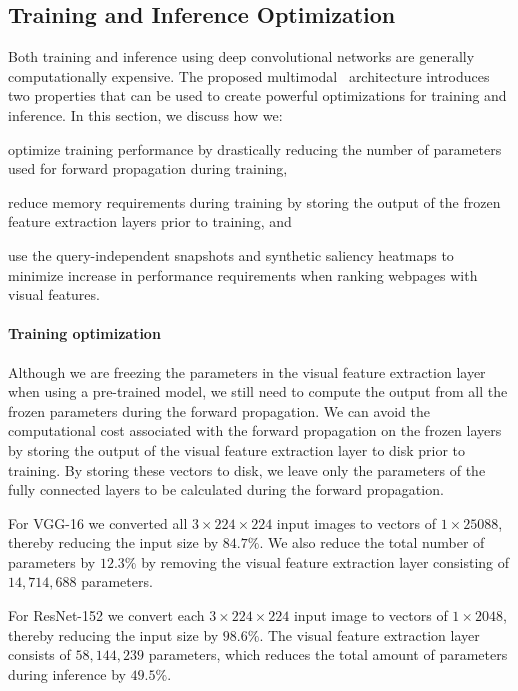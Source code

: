 \subsection{Training and Inference Optimization} \label{sec:sectionoptimalization}
Both training and inference using deep convolutional networks are generally computationally expensive.
The proposed multimodal \modelname~architecture introduces two properties that can be used to create powerful optimizations for training and inference. In this section, we discuss how we: \begin{inparaenum}[(i)]
\item optimize training performance by drastically reducing the number of parameters used for forward propagation during training, 
\item reduce memory requirements during training by storing the output of the frozen feature extraction layers prior to training, and
\item use the query-independent snapshots and synthetic saliency heatmaps to minimize increase in performance requirements when ranking webpages with visual features.
\end{inparaenum}

\paragraph{Training optimization} 
Although we are freezing the parameters in the visual feature extraction layer when using a pre-trained model, we still need to compute the output from all the frozen parameters during the forward propagation. We can avoid the computational cost associated with the forward propagation on the frozen layers by storing the output of the visual feature extraction layer to disk prior to training. By storing these vectors to disk, we leave only the parameters of the fully connected layers to be calculated during the forward propagation. 

For VGG-16 we converted all $3\times224\times224$ input images to vectors of $1\times25088$, thereby reducing the input size by $84.7\%$. We also reduce the total number of parameters by $12.3\%$ by removing the visual feature extraction layer consisting of $14,714,688$ parameters.

For ResNet-152 we convert each $3\times224\times224$ input image to vectors of $1\times2048$, thereby reducing the input size by $98.6\%$. The visual feature extraction layer consists of $58,144,239$ parameters, which reduces the total amount of parameters during inference by $49.5\%$.


